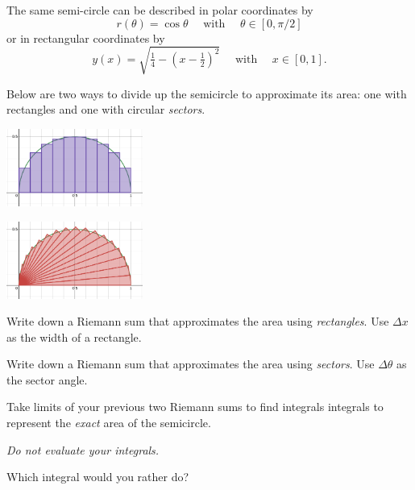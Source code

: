 \documentclass{workbook}
\begin{document}
\begin{slide}
	\question
		The same semi-circle can be described in polar coordinates by
		\[
r(\theta)=\cos\theta\quad\text{ with }\quad\theta\in[0,\pi/2]
		\]
		 or in rectangular
		coordinates by \[
		y(x)=\sqrt{\tfrac{1}{4}-(x-\tfrac{1}{2})^2}\quad\text{ with }\quad x\in[0,1].
		\]

		Below are two ways to divide up the semicircle to approximate its area: one with rectangles and one with circular \emph{sectors}.
		\begin{center}
	\includegraphics[height=1in]{images/riemann-rect.png}
		\end{center}
		\begin{center}
	\includegraphics[height=1in]{images/riemann-polar.png}
		\end{center}

	
	\begin{parts}
		\item Write down a Riemann sum that approximates the area using 
		\emph{rectangles}. Use $\Delta x$ as the width of a rectangle.

		\item Write down a Riemann sum that approximates the area using 
		\emph{sectors}. Use $\Delta \theta$ as the sector angle.
		
		\item Take limits of your previous two Riemann sums to find 
		integrals integrals to represent the \emph{exact} area of the semicircle. 

		\emph{Do not evaluate your integrals.}

		\item Which integral would you rather do?
	\end{parts}
\end{slide}
\end{document}
